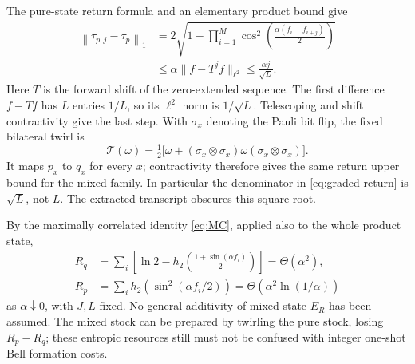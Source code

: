 \documentclass[11pt,a4paper]{article}
\numberwithin{equation}{section}
\theoremstyle{remark}
\newcommand{\ER}{E_R}
\newcommand{\normone}[1]{\left\|#1\right\|_1}
\newcommand{\hbin}{h_2}
\begin{document}
The pure-state return formula and an elementary product bound give
\begin{align}
 \normone{\tau_{p,j}-\tau_p}
 &=2\sqrt{1-\prod_{i=1}^M
       \cos^2\!\left(\frac{\alpha(f_i-f_{i+j})}{2}\right)} \nonumber\\
 &\leq \alpha\|f-T^jf\|_{\ell^2}
 \leq \frac{\alpha j}{\sqrt L}.                 \label{eq:graded-return}
\end{align}
Here \(T\) is the forward shift of the zero-extended sequence.
The first difference \(f-Tf\) has \(L\) entries \(1/L\), so its
\(\ell^2\) norm is \(1/\sqrt L\). Telescoping and shift contractivity
give the last step.
With \(\sigma_x\) denoting the Pauli bit flip, the fixed bilateral twirl is
\[
 \mathcal T(\omega)=\tfrac12\bigl[\omega+
       (\sigma_x\otimes\sigma_x)\omega(\sigma_x\otimes\sigma_x)\bigr].
\]
It maps \(p_x\) to \(q_x\) for every \(x\); contractivity therefore gives
the same return upper bound for the mixed family. In particular the
denominator in \eqref{eq:graded-return} is \(\sqrt L\), not \(L\).
The extracted transcript obscures this square root.

By the maximally correlated identity \eqref{eq:MC}, applied also to the
whole product state,
\begin{align*}
 R_q&=\sum_i\left[\ln2-
          \hbin\!\left(\frac{1+\sin(\alpha f_i)}2\right)\right]
             =\Theta(\alpha^2),\\
 R_p&=\sum_i\hbin\!\left(\sin^2(\alpha f_i/2)\right)
             =\Theta(\alpha^2\ln(1/\alpha))
\end{align*}
as \(\alpha\downarrow0\), with \(J,L\) fixed.
No general additivity of mixed-state \(\ER\) has been assumed.
The mixed stock can be prepared by twirling the pure stock, losing
\(R_p-R_q\); these entropic resources still must not be confused with
integer one-shot Bell formation costs.
\end{document}
